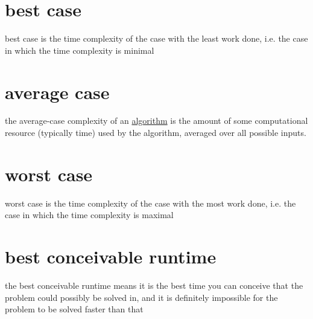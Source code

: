 \documentclass[a4paper,12pt]{article}
\newcommand{\?}{\stackrel{?}{=}}
\begin{document}
\section{best case}
\label{sec:org9d0d837}
\begin{definition}
best case is the time complexity of the case with the least work done, i.e. the case in which the time complexity is minimal\\[0pt]
\end{definition}
\section{average case}
\label{sec:org710fb4b}
\begin{definition}
the average-case complexity of an \href{20220706211958-algorithm.org}{algorithm} is the amount of some computational resource (typically time) used by the algorithm, averaged over all possible inputs.\\[0pt]
\end{definition}
\section{worst case}
\label{sec:org177a419}
\begin{definition}
worst case is the time complexity of the case with the most work done, i.e. the case in which the time complexity is maximal\\[0pt]
\end{definition}
\section{best conceivable runtime}
\label{sec:org44596e3}
the best conceivable runtime means it is the best time you can conceive that the problem could possibly be solved in, and it is definitely impossible for the problem to be solved faster than that\\[0pt]
\end{document}
